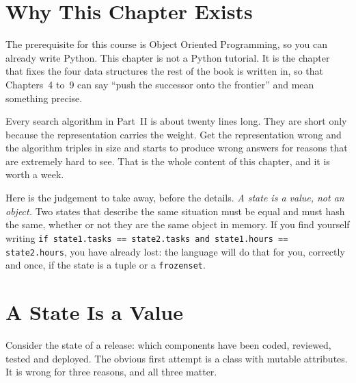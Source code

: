 \section{Why This Chapter Exists}

The prerequisite for this course is Object Oriented Programming, so you can already
write Python. This chapter is not a Python tutorial. It is the chapter that fixes
the four data structures the rest of the book is written in, so that Chapters~4
to~9 can say ``push the successor onto the frontier'' and mean something precise.

Every search algorithm in Part~II is about twenty lines long. They are short only
because the representation carries the weight. Get the representation wrong and the
algorithm triples in size and starts to produce wrong answers for reasons that are
extremely hard to see. That is the whole content of this chapter, and it is worth a
week.

\begin{conceptbox}
Here is the judgement to take away, before the details. \emph{A state is a value,
not an object.} Two states that describe the same situation must be equal and must
hash the same, whether or not they are the same object in memory. If you find
yourself writing \texttt{if state1.tasks == state2.tasks and state1.hours ==
state2.hours}, you have already lost: the language will do that for you, correctly
and once, if the state is a tuple or a \texttt{frozenset}.
\end{conceptbox}

\section{A State Is a Value}

Consider the state of a release: which components have been coded, reviewed,
tested and deployed. The obvious first attempt is a class with mutable attributes.
It is wrong for three reasons, and all three matter.

